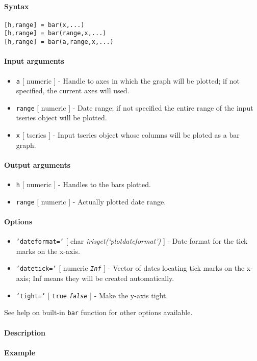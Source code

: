 


	\paragraph{Syntax}

\begin{verbatim}
[h,range] = bar(x,...)
[h,range] = bar(range,x,...)
[h,range] = bar(a,range,x,...)
\end{verbatim}

\paragraph{Input arguments}

\begin{itemize}
\item
  \texttt{a} {[} numeric {]} - Handle to axes in which the graph will be
  plotted; if not specified, the current axes will used.
\item
  \texttt{range} {[} numeric {]} - Date range; if not specified the
  entire range of the input tseries object will be plotted.
\item
  \texttt{x} {[} tseries {]} - Input tseries object whose columns will
  be ploted as a bar graph.
\end{itemize}

\paragraph{Output arguments}

\begin{itemize}
\item
  \texttt{h} {[} numeric {]} - Handles to the bars plotted.
\item
  \texttt{range} {[} numeric {]} - Actually plotted date range.
\end{itemize}

\paragraph{Options}

\begin{itemize}
\item
  \texttt{'dateformat='} {[} char \textbar{}
  \emph{irisget(`plotdateformat')} {]} - Date format for the tick marks
  on the x-axis.
\item
  \texttt{'datetick='} {[} numeric \textbar{} \emph{\texttt{Inf}} {]} -
  Vector of dates locating tick marks on the x-axis; Inf means they will
  be created automatically.
\item
  \texttt{'tight='} {[} \texttt{true} \textbar{} \emph{\texttt{false}}
  {]} - Make the y-axis tight.
\end{itemize}

See help on built-in \texttt{bar} function for other options available.

\paragraph{Description}

\paragraph{Example}


